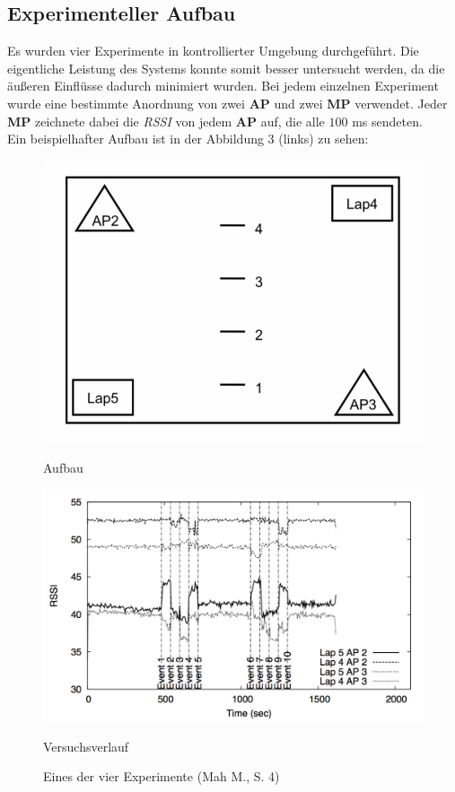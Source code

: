 \subsection{Experimenteller Aufbau}
Es wurden vier Experimente in kontrollierter Umgebung durchgeführt. Die eigentliche Leistung des Systems konnte somit besser untersucht werden, da die äußeren Einflüsse dadurch minimiert wurden. Bei jedem einzelnen Experiment wurde eine bestimmte Anordnung von zwei \textbf{AP} und zwei \textbf{MP} verwendet. Jeder \textbf{MP} zeichnete dabei die \textit{RSSI} von jedem \textbf{AP} auf, die alle $100$ ms sendeten.\\
Ein beispielhafter Aufbau ist in der Abbildung 3 (links) zu sehen:

\begin{figure}[H]
\centering
\begin{minipage}{.5\textwidth}
  \centering
	\includegraphics[scale=0.6]{pictures/experiment}
	\caption*{Aufbau}
\end{minipage}%
\begin{minipage}{.5\textwidth}
  \centering
  \includegraphics[scale=0.45]{pictures/versuch}
  \caption*{Versuchsverlauf}
\end{minipage}
\caption{Eines der vier Experimente (Mah M., S. 4)}
\end{figure}

